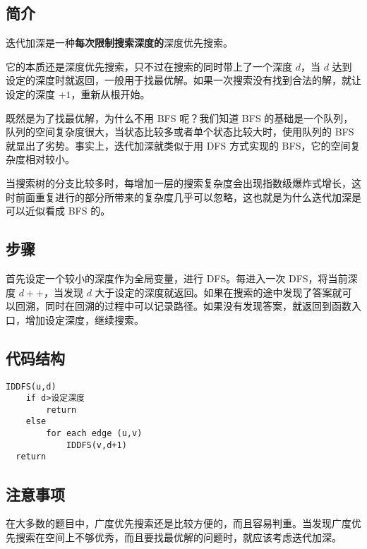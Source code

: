 
\subsection{简介}

迭代加深是一种\textbf{每次限制搜索深度的}深度优先搜索。

它的本质还是深度优先搜索，只不过在搜索的同时带上了一个深度 $d$，当 $d$ 达到设定的深度时就返回，一般用于找最优解。如果一次搜索没有找到合法的解，就让设定的深度 $+1$，重新从根开始。

既然是为了找最优解，为什么不用 BFS 呢？我们知道 BFS 的基础是一个队列，队列的空间复杂度很大，当状态比较多或者单个状态比较大时，使用队列的 BFS 就显出了劣势。事实上，迭代加深就类似于用 DFS 方式实现的 BFS，它的空间复杂度相对较小。

当搜索树的分支比较多时，每增加一层的搜索复杂度会出现指数级爆炸式增长，这时前面重复进行的部分所带来的复杂度几乎可以忽略，这也就是为什么迭代加深是可以近似看成 BFS 的。

\subsection{步骤}

首先设定一个较小的深度作为全局变量，进行 DFS。每进入一次 DFS，将当前深度 $d++$，当发现 $d$ 大于设定的深度就返回。如果在搜索的途中发现了答案就可以回溯，同时在回溯的过程中可以记录路径。如果没有发现答案，就返回到函数入口，增加设定深度，继续搜索。

\subsection{代码结构}

\begin{verbatim}
IDDFS(u,d)
    if d>设定深度
        return
    else
        for each edge (u,v)
            IDDFS(v,d+1)
  return
\end{verbatim}

\subsection{注意事项}

在大多数的题目中，广度优先搜索还是比较方便的，而且容易判重。当发现广度优先搜索在空间上不够优秀，而且要找最优解的问题时，就应该考虑迭代加深。
